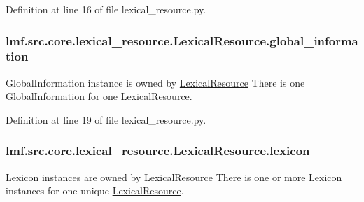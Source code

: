 Definition at line 16 of file lexical\+\_\+resource.\+py.

\hypertarget{classlmf_1_1src_1_1core_1_1lexical__resource_1_1_lexical_resource_a0d5cc63c48e3c5aa2bea6ad21c288e4f}{
\subsubsection[{global\+\_\+information}]{\setlength{\rightskip}{0pt plus 5cm}lmf.\+src.\+core.\+lexical\+\_\+resource.\+Lexical\+Resource.\+global\+\_\+information}}\label{classlmf_1_1src_1_1core_1_1lexical__resource_1_1_lexical_resource_a0d5cc63c48e3c5aa2bea6ad21c288e4f}


Global\+Information instance is owned by \hyperlink{classlmf_1_1src_1_1core_1_1lexical__resource_1_1_lexical_resource}{Lexical\+Resource} There is one Global\+Information for one \hyperlink{classlmf_1_1src_1_1core_1_1lexical__resource_1_1_lexical_resource}{Lexical\+Resource}. 



Definition at line 19 of file lexical\+\_\+resource.\+py.

\hypertarget{classlmf_1_1src_1_1core_1_1lexical__resource_1_1_lexical_resource_af4146645965f04411b37e8e52e7a04e0}{
\subsubsection[{lexicon}]{\setlength{\rightskip}{0pt plus 5cm}lmf.\+src.\+core.\+lexical\+\_\+resource.\+Lexical\+Resource.\+lexicon}}\label{classlmf_1_1src_1_1core_1_1lexical__resource_1_1_lexical_resource_af4146645965f04411b37e8e52e7a04e0}


Lexicon instances are owned by \hyperlink{classlmf_1_1src_1_1core_1_1lexical__resource_1_1_lexical_resource}{Lexical\+Resource} There is one or more Lexicon instances for one unique \hyperlink{classlmf_1_1src_1_1core_1_1lexical__resource_1_1_lexical_resource}{Lexical\+Resource}. 



